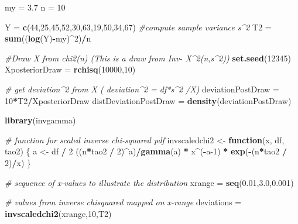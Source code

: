 \documentclass[]{article}
\newenvironment{Shaded}{\begin{snugshade}}{\end{snugshade}}
\newcommand{\CommentTok}[1]{\textcolor[rgb]{0.56,0.35,0.01}{\textit{#1}}}
\newcommand{\ControlFlowTok}[1]{\textcolor[rgb]{0.13,0.29,0.53}{\textbf{#1}}}
\newcommand{\DecValTok}[1]{\textcolor[rgb]{0.00,0.00,0.81}{#1}}
\newcommand{\FloatTok}[1]{\textcolor[rgb]{0.00,0.00,0.81}{#1}}
\newcommand{\KeywordTok}[1]{\textcolor[rgb]{0.13,0.29,0.53}{\textbf{#1}}}
\newcommand{\NormalTok}[1]{#1}
\newcommand{\OperatorTok}[1]{\textcolor[rgb]{0.81,0.36,0.00}{\textbf{#1}}}
\newcommand{\StringTok}[1]{\textcolor[rgb]{0.31,0.60,0.02}{#1}}
\begin{document}
\begin{Shaded}
\begin{Highlighting}[]
\NormalTok{my =}\StringTok{ }\FloatTok{3.7}
\NormalTok{n =}\StringTok{ }\DecValTok{10}

\NormalTok{Y =}\StringTok{ }\KeywordTok{c}\NormalTok{(}\DecValTok{44}\NormalTok{,}\DecValTok{25}\NormalTok{,}\DecValTok{45}\NormalTok{,}\DecValTok{52}\NormalTok{,}\DecValTok{30}\NormalTok{,}\DecValTok{63}\NormalTok{,}\DecValTok{19}\NormalTok{,}\DecValTok{50}\NormalTok{,}\DecValTok{34}\NormalTok{,}\DecValTok{67}\NormalTok{)}
\CommentTok{#compute sample variance s^2}
\NormalTok{T2 =}\StringTok{  }\KeywordTok{sum}\NormalTok{((}\KeywordTok{log}\NormalTok{(Y)}\OperatorTok{-}\NormalTok{my)}\OperatorTok{^}\DecValTok{2}\NormalTok{)}\OperatorTok{/}\NormalTok{n}

\CommentTok{#Draw X from chi2(n) (This is a draw from Inv- X^2(n,s^2))}
\KeywordTok{set.seed}\NormalTok{(}\DecValTok{12345}\NormalTok{)}
\NormalTok{XposteriorDraw =}\StringTok{ }\KeywordTok{rchisq}\NormalTok{(}\DecValTok{10000}\NormalTok{,}\DecValTok{10}\NormalTok{)}

\CommentTok{# get deviation^2 from X ( deviation^2 = df*s^2 /X)}
\NormalTok{deviationPostDraw =}\StringTok{ }\DecValTok{10}\OperatorTok{*}\NormalTok{T2}\OperatorTok{/}\NormalTok{XposteriorDraw}
\NormalTok{distDeviationPostDraw =}\StringTok{ }\KeywordTok{density}\NormalTok{(deviationPostDraw)}

\KeywordTok{library}\NormalTok{(invgamma)}

\CommentTok{# function for scaled inverse chi-squared pdf}
\NormalTok{invscaledchi2 <-}\StringTok{ }\ControlFlowTok{function}\NormalTok{(x, df, tao2) \{}
\NormalTok{  a <-}\StringTok{ }\NormalTok{df }\OperatorTok{/}\StringTok{ }\DecValTok{2}
\NormalTok{  ((n}\OperatorTok{*}\NormalTok{tao2 }\OperatorTok{/}\StringTok{ }\DecValTok{2}\NormalTok{)}\OperatorTok{^}\NormalTok{a)}\OperatorTok{/}\KeywordTok{gamma}\NormalTok{(a) }\OperatorTok{*}\StringTok{ }\NormalTok{x}\OperatorTok{^}\NormalTok{(}\OperatorTok{-}\NormalTok{a}\DecValTok{-1}\NormalTok{) }\OperatorTok{*}\StringTok{ }\KeywordTok{exp}\NormalTok{(}\OperatorTok{-}\NormalTok{(n}\OperatorTok{*}\NormalTok{tao2 }\OperatorTok{/}\StringTok{ }\DecValTok{2}\NormalTok{)}\OperatorTok{/}\NormalTok{x)}
\NormalTok{\}}


\CommentTok{# sequence of x-values to illustrate the distribution}
\NormalTok{xrange =}\StringTok{ }\KeywordTok{seq}\NormalTok{(}\FloatTok{0.01}\NormalTok{,}\FloatTok{3.0}\NormalTok{,}\FloatTok{0.001}\NormalTok{)}

\CommentTok{# values from inverse chisquared mapped on x-range}
\NormalTok{deviations =}\StringTok{ }\KeywordTok{invscaledchi2}\NormalTok{(xrange,}\DecValTok{10}\NormalTok{,T2)}


\end{Highlighting}
\end{Shaded}
\end{document}
